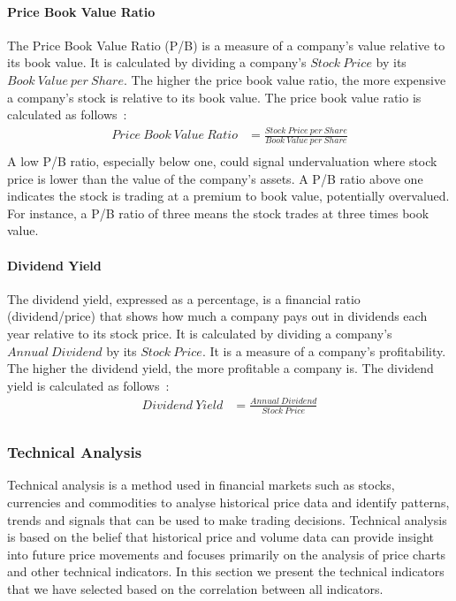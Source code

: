 \documentclass[../xlapes02]{subfiles}
\begin{document}
    \paragraph{Price Book Value Ratio}\label{par:price-book-value-ratio}
    The Price Book Value Ratio (P/B) is a measure of a company's value relative to its book value. It is calculated by dividing a company's $Stock\ Price$ by its $Book\ Value\ per\ Share$. The higher the price book value ratio, the more expensive a company's stock is relative to its book value. The price book value ratio is calculated as follows~\cite{investopedia}:
    \begin{equation}
        \begin{split}
            Price\ Book\ Value\ Ratio&=\frac{Stock\ Price\ per\ Share}{Book\ Value\ per\ Share}\\
        \end{split}
    \end{equation}
    A low P/B ratio, especially below one, could signal undervaluation where stock price is lower than the value of the company's assets. A P/B ratio above one indicates the stock is trading at a premium to book value, potentially overvalued. For instance, a P/B ratio of three means the stock trades at three times book value.

    \paragraph{Dividend Yield}\label{par:dividend-yield}
    The dividend yield, expressed as a percentage, is a financial ratio (dividend/price) that shows how much a company pays out in dividends each year relative to its stock price. It is calculated by dividing a company's $Annual\ Dividend$ by its $Stock\ Price$. It is a measure of a company's profitability. The higher the dividend yield, the more profitable a company is. The dividend yield is calculated as follows~\cite{investopedia}:
    \begin{equation}
        \begin{split}
            Dividend\ Yield&=\frac{Annual\ Dividend}{Stock\ Price}\\
        \end{split}
    \end{equation}

    \subsubsection{Technical Analysis}\label{subsubsec:technical-analysis}
    Technical analysis is a method used in financial markets such as stocks, currencies and commodities to analyse historical price data and identify patterns, trends and signals that can be used to make trading decisions. Technical analysis is based on the belief that historical price and volume data can provide insight into future price movements and focuses primarily on the analysis of price charts and other technical indicators. In this section we present the technical indicators that we have selected based on the correlation between all indicators.
\end{document}
